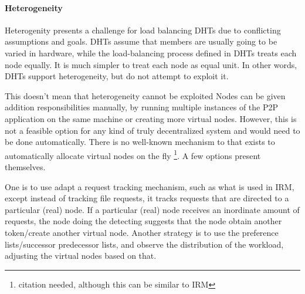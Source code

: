 



\paragraph{Heterogeneity}
\label{subsec:hetero}
Heterogenity presents a challenge for load balancing DHTs due to conflicting assumptions and goals. 
DHTs assume that members are usually going to be varied in hardware, while the load-balancing process defined in DHTs treats each node equally.
It is much simpler to treat each node as equal unit.
In other words, DHTs support heterogeneity, but do not attempt to exploit it.

This doesn't mean that heterogeneity cannot be exploited
Nodes can be given addition responsibilities manually, by running multiple instances of the P2P application on the same machine or creating more virtual nodes.
However, this is not a feasible option for any kind of truly decentralized system and would need to be done automatically.
There is no well-known mechanism to that exists to automatically  allocate virtual nodes on the fly \footnote{citation needed, although this can be similar to IRM}. 
A few options present themselves.  %

One is to use adapt a request tracking mechanism, such as what is used in IRM, except instead of tracking file requests, it tracks requests that are directed to a particular (real) node. 
If a particular (real) node receives an inordinate amount of requests, the node doing the detecting suggests that the node obtain another token/create another virtual node.
Another strategy is to use the preference lists/successor predecessor lists, and observe the distribution of the workload, adjusting the virtual nodes based on that. 

